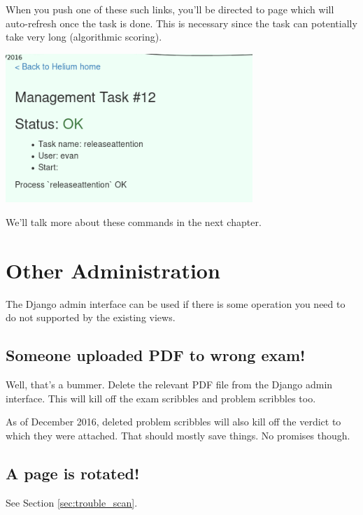When you push one of these such links, you'll be directed to page
which will auto-refresh once the task is done.
This is necessary since the task can potentially take very long
(algorithmic scoring).
\begin{center}
	\includegraphics[width=0.7\textwidth]{images/viewtask.png}
\end{center}

We'll talk more about these commands in the next chapter.

\section{Other Administration}
The Django admin interface can be used if there
is some operation you need to do not supported by the existing views.
\subsection{Someone uploaded PDF to wrong exam!}
Well, that's a bummer. 
Delete the relevant PDF file from the Django admin interface.
This will kill off the exam scribbles and problem scribbles too.

As of December 2016, deleted problem scribbles will also kill
off the verdict to which they were attached.
That should mostly save things. No promises though.

\subsection{A page is rotated!}
See Section \ref{sec:trouble_scan}.
